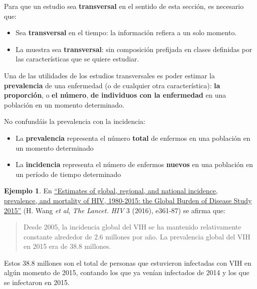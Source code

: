 \documentclass[
]{book}
\providecommand{\tightlist}{%
  \setlength{\itemsep}{0pt}\setlength{\parskip}{0pt}}
\theoremstyle{definition}
\theoremstyle{definition}
\newtheorem{example}{Ejemplo}[chapter]
\theoremstyle{definition}
\theoremstyle{definition}
\theoremstyle{remark}
\begin{document}
\begin{rmdimportant}
Para que un estudio sea \textbf{transversal} en el sentido de esta sección, es necesario que:

\begin{itemize}
\tightlist
\item
  Sea \textbf{transversal} en el tiempo: la información refiera a un solo momento.
\item
  La muestra sea \textbf{transversal}: sin composición prefijada en clases definidas por las características que se quiere estudiar.
\end{itemize}
\end{rmdimportant}

Una de las utilidades de los estudios transversales es poder estimar la \textbf{prevalencia} de una enfermedad (o de cualquier otra característica): \textbf{la proporción}, o \textbf{el número}, \textbf{de individuos con la enfermedad} en una población en un momento determinado.

\begin{rmdcaution}
No confundáis la prevalencia con la incidencia:

\begin{itemize}
\tightlist
\item
  La \textbf{prevalencia} representa el número \textbf{total} de enfermos en una población en un momento determinado
\item
  La \textbf{incidencia} representa el número de enfermos \textbf{nuevos} en una población en un período de tiempo determinado
\end{itemize}
\end{rmdcaution}

\begin{example}
\protect\hypertarget{exm:unnamed-chunk-40}{}\label{exm:unnamed-chunk-40}En \href{https://www.sciencedirect.com/science/article/pii/S235230181630087X}{``Estimates of global, regional, and national incidence, prevalence, and mortality of HIV, 1980-2015: the Global Burden of Disease Study 2015''} (H. Wang \emph{et al}, \emph{The Lancet. HIV} 3 (2016), e361-87) se afirma que:

\begin{quote}
Desde 2005, la incidencia global del VIH se ha mantenido relativamente constante alrededor de 2.6 millones por año. La prevalencia global del VIH en 2015 era de 38.8 millones.
\end{quote}

Estos 38.8 millones son el total de personas que estuvieron infectadas con VIH en algún momento de 2015, contando los que ya venían infectados de 2014 y los que se infectaron en 2015.
\end{example}
\end{document}
